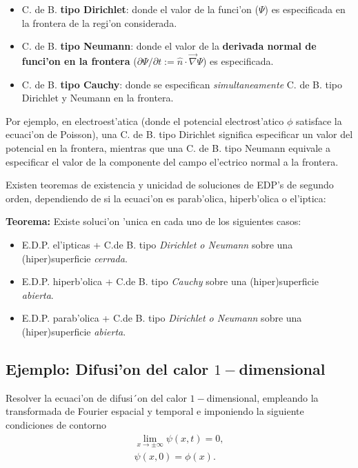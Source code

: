 \begin{itemize}
\item C. de B. \textbf{tipo Dirichlet}: donde el valor de la funci'on ($\Psi$) es especificada en la frontera de la regi'on considerada.
\item C. de B. \textbf{tipo Neumann}: donde el valor de la \textbf{derivada normal de funci'on en la frontera} ($\partial\Psi/\partial t:=\hat{n}\cdot\vec\nabla\Psi$) es especificada.
\item C. de B. \textbf{tipo Cauchy}: donde se especifican \textit{simultaneamente} C. de B. tipo Dirichlet y Neumann en la frontera.
\end{itemize}
Por ejemplo, en electroest'atica (donde el potencial electrost'atico $\phi$ satisface la ecuaci'on de Poisson), una C. de B. tipo Dirichlet significa especificar un valor del potencial en la frontera, mientras que una C. de B. tipo Neumann equivale a especificar el valor de la componente del campo el'ectrico normal a la frontera. 

Existen teoremas de existencia y unicidad de soluciones de EDP's de segundo orden, dependiendo de si la ecuaci'on es parab'olica, hiperb'olica o el'iptica:

\textbf{Teorema:} Existe soluci'on 'unica en cada uno de los siguientes casos:

\begin{itemize}
\item E.D.P. el'ipticas +  C.de B. tipo \textit{Dirichlet o Neumann} sobre una (hiper)superficie \textit{cerrada}.
\item E.D.P. hiperb'olica + C.de B. tipo \textit{Cauchy} sobre una (hiper)superficie \textit{abierta}.
\item E.D.P. parab'olica + C.de B. tipo \textit{Dirichlet o Neumann} sobre una (hiper)superficie \textit{abierta}.
\end{itemize}

\subsection{Ejemplo: Difusi'on del calor $1-$dimensional}

Resolver la ecuaci'on de difusi´on del calor $1-$dimensional, empleando la transformada de Fourier espacial y temporal e imponiendo la siguiente condiciones de contorno
\begin{align}
\lim_{x \rightarrow \pm \infty}\psi(x,t)=0,\label{eq:bc1}\\
\psi(x,0)=\phi(x).\label{eq:bc2}
\end{align}

